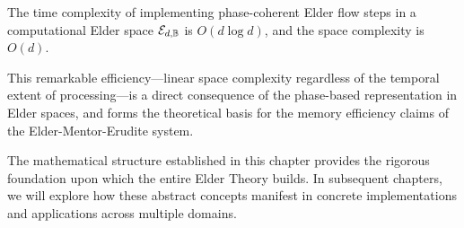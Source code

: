 \begin{theorem}
The time complexity of implementing phase-coherent Elder flow steps in a computational Elder space $\mathcal{E}_{d, \mathbb{B}}$ is $O(d \log d)$, and the space complexity is $O(d)$.
\end{theorem}

This remarkable efficiency—linear space complexity regardless of the temporal extent of processing—is a direct consequence of the phase-based representation in Elder spaces, and forms the theoretical basis for the memory efficiency claims of the Elder-Mentor-Erudite system.

The mathematical structure established in this chapter provides the rigorous foundation upon which the entire Elder Theory builds. In subsequent chapters, we will explore how these abstract concepts manifest in concrete implementations and applications across multiple domains.